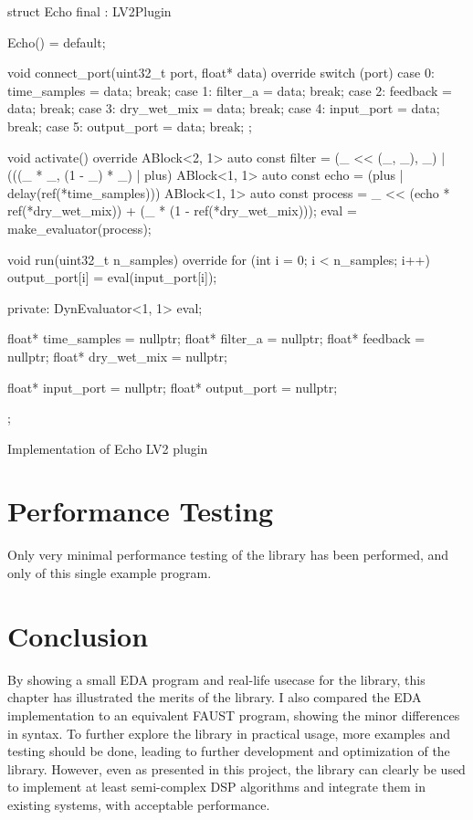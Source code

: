 \begin{listing}
  \begin{cppcodenl}
  struct Echo final : LV2Plugin {
    Echo() = default;

    void connect_port(uint32_t port, float* data) override
    {
      switch (port) {
        case 0: time_samples = data; break;
        case 1: filter_a = data; break;
        case 2: feedback = data; break;
        case 3: dry_wet_mix = data; break;
        case 4: input_port = data; break;
        case 5: output_port = data; break;
      }
    };

    void activate() override
    {
      ABlock<2, 1> auto const filter = (_ << (_, _), _) | (((_ * _, (1 - _) * _) | plus) %
      ABlock<1, 1> auto const echo = (plus | delay(ref(*time_samples))) %
      ABlock<1, 1> auto const process = _ << (echo * ref(*dry_wet_mix)) + (_ * (1 - ref(*dry_wet_mix)));
      eval = make_evaluator(process);
    }

    void run(uint32_t n_samples) override
    {
      for (int i = 0; i < n_samples; i++) {
        output_port[i] = eval(input_port[i]);
      }
    }
    
  private:
    DynEvaluator<1, 1> eval;

    float* time_samples = nullptr;
    float* filter_a = nullptr;
    float* feedback = nullptr;
    float* dry_wet_mix = nullptr;
    
    float* input_port = nullptr;
    float* output_port = nullptr;
  };
  \end{cppcodenl}
  \caption{Implementation of Echo LV2 plugin}
  \label{lst:echo_lv2}
\end{listing}

\section{Performance Testing}

Only very minimal performance testing of the library has been performed, and only of this single example
program.


\section{Conclusion}

By showing a small EDA program and real-life usecase for the library, this chapter has illustrated the merits
of the library. I also compared the EDA implementation to an equivalent FAUST program, showing the minor
differences in syntax. To further explore the library in practical usage, more examples and testing should be
done, leading to further development and optimization of the library. However, even as presented in this
project, the library can clearly be used to implement at least semi-complex DSP algorithms and integrate them
in existing systems, with acceptable performance.
